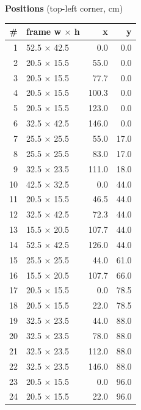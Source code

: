 \documentclass[a4paper,landscape,10pt]{article}
\begin{document}
\begin{minipage}[t]{0.25\textwidth}
\vspace{8pt}
{\bfseries Positions} (top-left corner, cm)\\[2pt]
\tiny
\begin{tabular}{@{}r l r r@{}}
\toprule
\# & frame w $\times$ h & x & y \\
\midrule
1 & 52.5 $\times$ 42.5 & 0.0 & 0.0 \\
2 & 20.5 $\times$ 15.5 & 55.0 & 0.0 \\
3 & 20.5 $\times$ 15.5 & 77.7 & 0.0 \\
4 & 20.5 $\times$ 15.5 & 100.3 & 0.0 \\
5 & 20.5 $\times$ 15.5 & 123.0 & 0.0 \\
6 & 32.5 $\times$ 42.5 & 146.0 & 0.0 \\
7 & 25.5 $\times$ 25.5 & 55.0 & 17.0 \\
8 & 25.5 $\times$ 25.5 & 83.0 & 17.0 \\
9 & 32.5 $\times$ 23.5 & 111.0 & 18.0 \\
10 & 42.5 $\times$ 32.5 & 0.0 & 44.0 \\
11 & 20.5 $\times$ 15.5 & 46.5 & 44.0 \\
12 & 32.5 $\times$ 42.5 & 72.3 & 44.0 \\
13 & 15.5 $\times$ 20.5 & 107.7 & 44.0 \\
14 & 52.5 $\times$ 42.5 & 126.0 & 44.0 \\
15 & 25.5 $\times$ 25.5 & 44.0 & 61.0 \\
16 & 15.5 $\times$ 20.5 & 107.7 & 66.0 \\
17 & 20.5 $\times$ 15.5 & 0.0 & 78.5 \\
18 & 20.5 $\times$ 15.5 & 22.0 & 78.5 \\
19 & 32.5 $\times$ 23.5 & 44.0 & 88.0 \\
20 & 32.5 $\times$ 23.5 & 78.0 & 88.0 \\
21 & 32.5 $\times$ 23.5 & 112.0 & 88.0 \\
22 & 32.5 $\times$ 23.5 & 146.0 & 88.0 \\
23 & 20.5 $\times$ 15.5 & 0.0 & 96.0 \\
24 & 20.5 $\times$ 15.5 & 22.0 & 96.0 \\
\bottomrule
\end{tabular}
\end{minipage}
\clearpage
\end{document}
